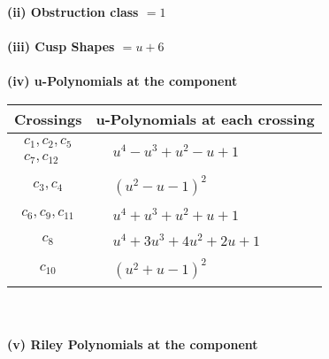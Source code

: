 \documentclass[1p]{elsarticle_modified}
\theoremstyle{definition}
\begin{document}
\flushleft \textbf{(ii) Obstruction class $= 1$}\\~\\
\flushleft \textbf{(iii) Cusp Shapes $= u+6$}\\~\\
\newpage\renewcommand{\arraystretch}{1}
\flushleft \textbf{(iv) u-Polynomials at the component}\newline \\
\begin{tabular}{m{50pt}|m{274pt}}
Crossings & \hspace{64pt}u-Polynomials at each crossing \\
\hline $$\begin{aligned}c_{1},c_{2},c_{5}\\c_{7},c_{12}\end{aligned}$$&$\begin{aligned}
&u^4- u^3+u^2- u+1
\end{aligned}$\\
\hline $$\begin{aligned}c_{3},c_{4}\end{aligned}$$&$\begin{aligned}
&(u^2- u-1)^2
\end{aligned}$\\
\hline $$\begin{aligned}c_{6},c_{9},c_{11}\end{aligned}$$&$\begin{aligned}
&u^4+u^3+u^2+u+1
\end{aligned}$\\
\hline $$\begin{aligned}c_{8}\end{aligned}$$&$\begin{aligned}
&u^4+3 u^3+4 u^2+2 u+1
\end{aligned}$\\
\hline $$\begin{aligned}c_{10}\end{aligned}$$&$\begin{aligned}
&(u^2+u-1)^2
\end{aligned}$\\
\hline
\end{tabular}\\~\\
\newpage\renewcommand{\arraystretch}{1}
\flushleft \textbf{(v) Riley Polynomials at the component}\newline \\
\end{document}
